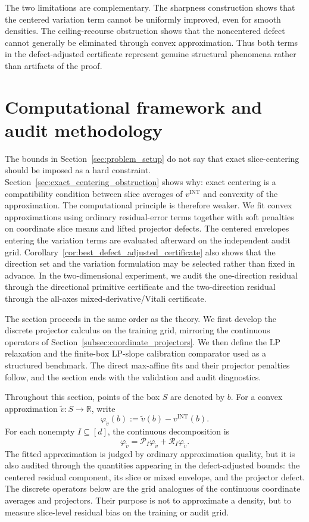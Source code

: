 \documentclass[11pt,letterpaper]{article}
\theoremstyle{definition}
\theoremstyle{remark}
\newcommand{\INT}{\mathrm{INT}}
\begin{document}
The two limitations are complementary. The sharpness construction shows that
the centered variation term cannot be uniformly improved, even for smooth
densities. The ceiling-recourse obstruction shows that the noncentered defect
cannot generally be eliminated through convex approximation. Thus both terms
in the defect-adjusted certificate represent genuine structural phenomena
rather than artifacts of the proof.



\section{Computational framework and audit methodology}
\label{sec:framework_design_revised}

The bounds in Section~\ref{sec:problem_setup} do not say that exact
slice-centering should be imposed as a hard constraint. Section~\ref{sec:exact_centering_obstruction}
shows why: exact centering is a compatibility condition between slice averages
of $v^{\INT}$ and convexity of the approximation. The computational principle
is therefore weaker. We fit convex approximations using ordinary residual-error terms together with soft penalties on coordinate slice means and lifted projector defects. The
centered envelopes entering the variation terms are evaluated afterward on
the independent audit grid. Corollary~\ref{cor:best_defect_adjusted_certificate}
also shows that the direction set and the variation formulation may be selected
rather than fixed in advance. In the two-dimensional experiment, we audit the
one-direction residual through the directional primitive certificate and the
two-direction residual through the all-axes mixed-derivative/Vitali
certificate.

The section proceeds in the same order as the theory. We first develop the
discrete projector calculus on the training grid, mirroring the continuous
operators of Section~\ref{subsec:coordinate_projectors}. We then define the LP
relaxation and the finite-box LP-slope calibration comparator used as a structured
benchmark. The direct max-affine fits and their projector penalties follow,
and the section ends with the validation and audit diagnostics.

Throughout this section, points of the box $S$ are denoted by $b$. For a convex
approximation $\widetilde v:S\to\mathbb R$, write
$$
\varphi_{\widetilde v}(b):=\widetilde v(b)-v^{\INT}(b).
$$
For each nonempty $I\subseteq[d]$, the continuous decomposition is
$$
\varphi_{\widetilde v}
=
\mathcal P_I\varphi_{\widetilde v}
+
\mathcal R_I\varphi_{\widetilde v}.
$$
The fitted approximation is judged by ordinary approximation quality, but it is
also audited through the quantities appearing in the defect-adjusted bounds:
the centered residual component, its slice or mixed envelope, and the
projector defect. The discrete operators below are the grid analogues of the continuous
coordinate averages and projectors. Their purpose is not to approximate a
density, but to measure slice-level residual bias on the training or audit
grid.
\end{document}
